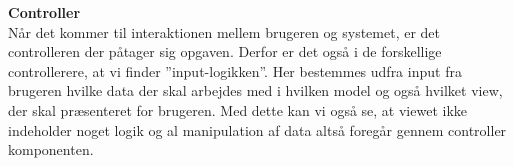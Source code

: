 \textbf{Controller}\\
Når det kommer til interaktionen mellem brugeren og systemet, er det controlleren der påtager sig opgaven.
Derfor er det også i de forskellige controllerere, at vi finder ''input-logikken''. Her bestemmes udfra input fra brugeren hvilke data der skal arbejdes med i hvilken model og også hvilket view, der skal præsenteret for brugeren. Med dette kan vi også se, at viewet ikke indeholder noget logik og al manipulation af data altså foregår gennem controller komponenten.
